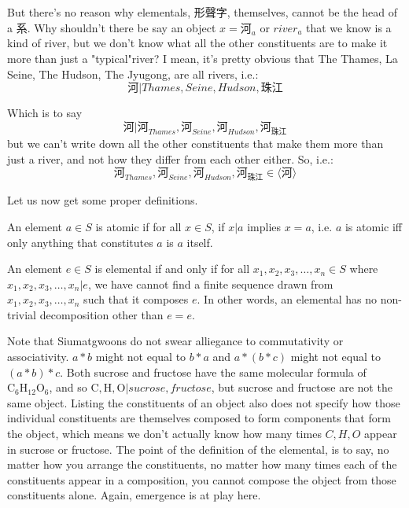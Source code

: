 But there's no reason why elementals, 形聲字, themselves, cannot be the head of a 系. Why shouldn't there be say an object $x=\text{河}_{a}$ or $river_{a}$ that we know is a kind of river, but we don't know what all the other constituents are to make it more than just a "typical"river? I mean, it's pretty obvious that The Thames, La Seine, The Hudson, The Jyugong, are all rivers, i.e.: 
$$\text{河} | Thames, Seine, Hudson, \text{珠江}$$

Which is to say 
$$\text{河} |  \text{河}_{Thames},\text{河}_{Seine},\text{河}_{Hudson},\text{河}_{\text{珠江}} $$
but we can't write down all the other constituents that make them more than just a river, and not how they differ from each other either. So, 
i.e.: 
$$\text{河}_{Thames},\text{河}_{Seine},\text{河}_{Hudson},\text{河}_{\text{珠江}} \in \langle \text{河} \rangle$$



Let us now get some proper definitions.


\begin{definition}[Atomics]\label{def:atomics}
    An element $a \in S$ is atomic if for all $x\in S$, if $x|a$ implies $x=a$, i.e. $a$ is atomic iff only anything that constitutes $a$ is $a$ itself.
\end{definition}

\begin{definition}[Elementals]\label{def:elementals}
    An element $e \in S$ is elemental if and only if for all $x_1, x_2, x_3, \ldots, x_n \in S$ where $x_1, x_2, x_3, \ldots, x_n | e$, we have cannot find a finite sequence drawn from $x_1, x_2, x_3,\ldots, x_n $ such that it composes $e$. In other words, an elemental has no non-trivial decomposition other than $e = e$. 
\end{definition}


Note that Siumatgwoons do not swear alliegance to commutativity or associativity. $a*b$ might not equal to $b*a$ and $a*(b*c)$ might not equal to $(a*b)*c$. Both sucrose and fructose have the same molecular formula of $\text{C}_6\text{H}_{12}\text{O}_6$, and so $\text{C}, \text{H}, \text{O} | sucrose, fructose$, but sucrose and fructose are not the same object. Listing the constituents of an object also does not specify how those individual constituents are themselves composed to form components that form the object, which means we don't actually know how many times $C, H, O$ appear in sucrose or fructose. The point of the definition of the elemental, is to say, no matter how you arrange the constituents, no matter how many times each of the constituents appear in a composition, you cannot compose the object from those constituents alone. Again, emergence is at play here.



